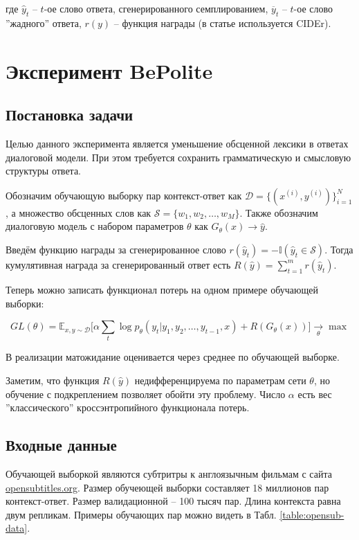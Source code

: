 \documentclass[12pt,a4paper]{amsart}
\begin{document}
где $\hat{y}_t$ -- $t$-ое слово ответа, сгенерированного семплированием, $\overline{y}_t$ -- $t$-ое слово ''жадного'' ответа, $r(y)$ -- функция награды (в статье используется CIDEr).


\pagebreak
\section{Эксперимент BePolite}

\subsection{Постановка задачи}

Целью данного эксперимента является уменьшение обсценной лексики в ответах диалоговой модели. При этом требуется сохранить грамматическую и смысловую структуры ответа.

Обозначим обучающую выборку пар контекст-ответ как $\mathcal{D} = \lbrace (x^{(i)}, y^{(i)}) \rbrace_{i=1}^N$, а множество обсценных слов как $\mathcal{S} = \{w_1, w_2, \dots, w_M\}$. Также обозначим диалоговую модель с набором параметров $\theta$ как $G_\theta (x) \rightarrow \hat{y}$. 

Введём функцию награды за сгенерированное слово $r(\hat{y}_t) = -\mathbb{I}(\hat{y}_t \in \mathcal{S})$. Тогда кумулятивная награда за сгенерированный ответ есть $R(\hat{y}) = \sum_{t=1}^m r(\hat{y}_t)$.

Теперь можно записать функционал потерь на одном примере обучающей выборки:

\begin{equation} \label{eq:rl-bepolite-loss}
GL(\theta) = \mathbb{E}_{x,y \sim \mathcal{D}}\big[\alpha\sum_{t} \log p_\theta (y_t | y_1, y_2, \dots, y_{t-1}, x) + R(G_\theta(x))\big] \xrightarrow[\theta]{} \max
\end{equation}

В реализации матожидание оценивается через среднее по обучающей выборке.

Заметим, что функция $R(\hat{y})$ недифференцируема по параметрам сети $\theta$, но обучение с подкреплением позволяет обойти эту проблему. Число $\alpha$ есть вес ''классического'' кроссэнтропийного функционала потерь.

\subsection{Входные данные}

Обучающей выборкой являются субтритры к англоязычным фильмам с сайта \url{opensubtitles.org}. Размер обучеющей выборки составляет 18 миллионов пар контекст-ответ. Размер валидационной -- 100 тысяч пар. Длина контекста равна двум репликам. Примеры обучающих пар можно видеть в Табл. \ref{table:opensub-data}.
\end{document}
